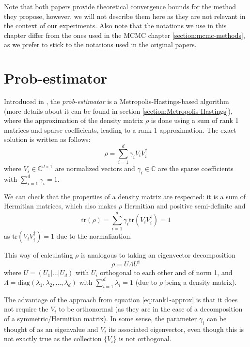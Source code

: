 \documentclass[12pt]{memoir}
\newcommand{\tr}{\text{tr}}
\begin{document}
Note that both papers provide theoretical convergence bounds for the method they propose, however, we will not describe them here as they are not relevant in the context of our experiments. Also note that the notations we use in this chapter differ from the ones used in the MCMC chapter \ref{section:mcmc-methods}, as we prefer to stick to the notations used in the original papers.

\section{Prob-estimator}\label{section:prob-estimator}
Introduced in \cite{MA17}, the \textit{prob-estimator} is a Metropolis-Hastings-based algorithm (more details about it can be found in section \ref{section:Metropolis-Hastings}), where the approximation of the density matrix $\rho$ is done using a sum of rank 1 matrices and sparse coefficients, leading to a rank 1 approximation. The exact solution is written as follows:
\begin{equation}\label{eq:rank1-approx}
    \rho = \sum_{i=1}^d \gamma_i V_i V_i^\dagger
\end{equation}
where $V_i \in \mathbb{C}^{d\times 1}$ are normalized vectors and $\gamma_i \in \mathbb{C}$ are the sparse coefficients with $\sum_{i=1}^d \gamma_i = 1$.\medbreak

We can check that the properties of a density matrix are respected: it is a sum of Hermitian matrices, which also makes $\rho$ Hermitian and positive semi-definite and 
\begin{equation}
    \tr(\rho) = \sum_{i=1}^{d} \gamma_i \tr(V_i V_i^\dagger) = 1
\end{equation}
as $\tr(V_i V_i^\dagger) = 1$ due to the normalization.\medbreak

This way of calculating $\rho$ is analogous to taking an eigenvector decomposition
\begin{equation}
    \rho = U\Lambda U^\dagger
\end{equation}
where $U = (U_1|\dots|U_d)$ with $U_i$ orthogonal to each other and of norm 1, and $\Lambda = \text{diag}(\lambda_1, \lambda_2, \dots, \lambda_d)$ with $\sum_{i=1}^d \lambda_i = 1$ (due to $\rho$ being a density matrix).\medbreak

The advantage of the approach from equation \ref{eq:rank1-approx} is that it does not require the $V_i$ to be orthonormal (as they are in the case of a decomposition of a symmetric/Hermitian matrix). In some sense, the parameter $\gamma_i$ can be thought of as an eigenvalue and $V_i$ its associated eigenvector, even though this is not exactly true as the collection $\{V_i\}$ is not orthogonal. \medbreak
\end{document}
